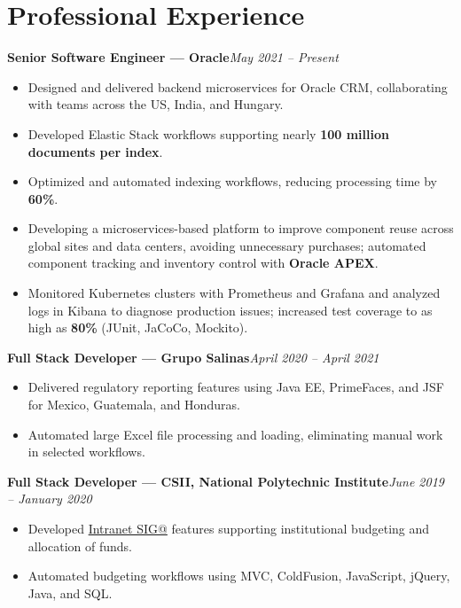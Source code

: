 \documentclass[11pt,letterpaper]{article}
\newcommand{\role}[3]{\textbf{#1 --- #2}\hfill\textit{#3}\par}
\begin{document}
\section{Professional Experience}
\role{Senior Software Engineer}{Oracle}{May 2021 -- Present}
\begin{itemize}
\item Designed and delivered backend microservices for Oracle CRM, collaborating with teams across the US, India, and Hungary.
\item Developed Elastic Stack workflows supporting nearly \textbf{100 million documents per index}.
\item Optimized and automated indexing workflows, reducing processing time by \textbf{60\%}.
\item Developing a microservices-based platform to improve component reuse across global sites and data centers, avoiding unnecessary purchases; automated component tracking and inventory control with \textbf{Oracle APEX}.
\item Monitored Kubernetes clusters with Prometheus and Grafana and analyzed logs in Kibana to diagnose production issues; increased test coverage to as high as \textbf{80\%} (JUnit, JaCoCo, Mockito).
\end{itemize}

\role{Full Stack Developer}{Grupo Salinas}{April 2020 -- April 2021}
\begin{itemize}
\item Delivered regulatory reporting features using Java EE, PrimeFaces, and JSF for Mexico, Guatemala, and Honduras.
\item Automated large Excel file processing and loading, eliminating manual work in selected workflows.
\end{itemize}

\role{Full Stack Developer}{CSII, National Polytechnic Institute}{June 2019 -- January 2020}
\begin{itemize}
\item Developed \href{https://www.siga.ipn.mx/}{Intranet SIG@} features supporting institutional budgeting and allocation of funds.
\item Automated budgeting workflows using MVC, ColdFusion, JavaScript, jQuery, Java, and SQL.
\end{itemize}

\end{document}
